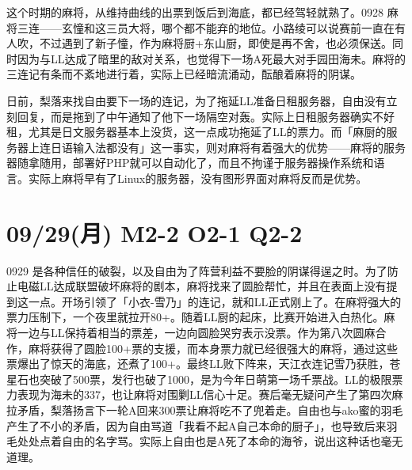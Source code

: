 这个时期的麻将，从维持曲线的出票到饭后到海底，都已经驾轻就熟了。0928 麻将三连——玄憧和这三员大将，哪个都不能弃的地位。小路绫可以说赛前一直在有人吹，不过遇到了新子憧，作为麻将厨+东山厨，即使是再不舍，也必须保送。同时因为与LL达成了暗里的敌对关系，也觉得下一场A死最大对手园田海未。麻将的三连记有条而不紊地进行着，实际上已经暗流涌动，酝酿着麻将的阴谋。

日前，梨落来找自由要下一场的连记，为了拖延LL准备日租服务器，自由没有立刻回复，而是拖到了中午通知了他下一场隔空对轰。实际上日租服务器确实不好租，尤其是日文服务器基本上没货，这一点成功拖延了LL的票力。而「麻厨的服务器上连日语输入法都没有」这一事实，则对麻将有着强大的优势——麻将的服务器随拿随用，部署好PHP就可以自动化了，而且不拘谨于服务器操作系统和语言。实际上麻将早有了Linux的服务器，没有图形界面对麻将反而是优势。

\section{09/29(月) M2-2 O2-1 Q2-2}


0929 是各种信任的破裂，以及自由为了阵营利益不要脸的阴谋得逞之时。为了防止电磁LL达成联盟破坏麻将的剧本，麻将找来了圆脸帮忙，并且在表面上没有提到这一点。开场引领了「小衣-雪乃」的连记，就和LL正式刚上了。在麻将强大的票力压制下，一个夜里就拉开80+。随着LL厨的起床，比赛开始进入白热化。麻将一边与LL保持着相当的票差，一边向圆脸哭穷表示没票。作为第八次圆麻合作，麻将获得了圆脸100+票的支援，而本身票力就已经很强大的麻将，通过这些票爆出了惊天的海底，还煮了100+。最终LL败下阵来，天江衣连记雪乃获胜，苍星石也突破了500票，发行也破了1000，是为今年日萌第一场千票战。LL的极限票力表现为海未的337，也让麻将对围剿LL信心十足。赛后毫无疑问产生了第四次麻拉矛盾，梨落扬言下一轮A回来300票让麻将吃不了兜着走。自由也与ako蜜的羽毛产生了不小的矛盾，因为自由骂道「我看不起A自己本命的厨子」，也导致后来羽毛处处点着自由的名字骂。实际上自由也是A死了本命的海爷，说出这种话也毫无道理。


